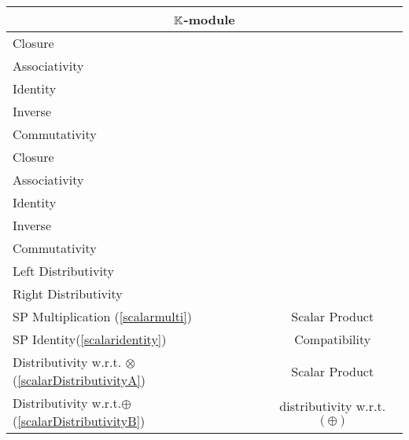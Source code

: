 \documentclass[a4paper,12pt]{scrartcl}    %
\newcommand{\OpA}{\otimes}
\newcommand{\OpB}{\oplus}
\begin{document}
\begin{landscape}
\begin{minipage}[t][]{0.40 \linewidth}
\begin{minipage}[c]{1\textwidth}
			\vspace{3em}
			\begin{tabular}{|l|c|} %
			  \hline
			  \multicolumn{2}{|c|}{\cellcolor{blue!25}$\mathbb{K}$-module} \\
			  \hline
			    \cellcolor{green!25} \footnotesize Closure& \cellcolor{yellow!25}  \\
			    \cellcolor{green!25} \footnotesize Associativity& \cellcolor{yellow!25}  \\
			    \cellcolor{green!25} \footnotesize Identity& \cellcolor{yellow!25} \\
			    \cellcolor{green!25} \footnotesize Inverse& \cellcolor{yellow!25} \\
			    \cellcolor{green!25} \footnotesize Commutativity & \cellcolor{yellow!25} \\
			    \cellcolor{green!25} \footnotesize Closure& \cellcolor{yellow!25}  \\
			    \cellcolor{green!25} \footnotesize Associativity& \cellcolor{yellow!25}  \\
			    \cellcolor{green!25} \footnotesize Identity& \cellcolor{yellow!25} \\
			    \cellcolor{red!25} \footnotesize Inverse& \cellcolor{yellow!25} \\
			    \cellcolor{red!25} \footnotesize Commutativity& \cellcolor{yellow!25} \\
			  	\cellcolor{green!25} \footnotesize Left Distributivity&  \cellcolor{yellow!25} \\
			    \cellcolor{green!25} \footnotesize Right Distributivity & \tiny\cellcolor{yellow!25} \multirow{-12}{*}{\tiny \rotatebox[origin=c]{90}{Ring $(\KField,+,\cdot,1)$})}  \\
			   \hline
			  \hline
			     \cellcolor{green!25} \footnotesize SP Multiplication (\ref{scalarmulti})&  \tiny\cellcolor{yellow!25}Scalar Product\\
			    \cellcolor{green!25} \footnotesize SP Identity(\ref{scalaridentity}) & \tiny\cellcolor{yellow!25} Compatibility  \\
			   \hline 
			    \cellcolor{green!25} \footnotesize Distributivity w.r.t. $\OpA$ (\ref{scalarDistributivityA})&  \tiny\cellcolor{yellow!25}Scalar Product\\
			    \cellcolor{green!25} \footnotesize Distributivity w.r.t.$\OpB$ (\ref{scalarDistributivityB}) & \tiny\cellcolor{yellow!25} distributivity w.r.t. $\big(\OpB\big)$  \\
			   \hline
			\end{tabular}
		\end{minipage}


\end{minipage}
\end{landscape}
\end{document}
